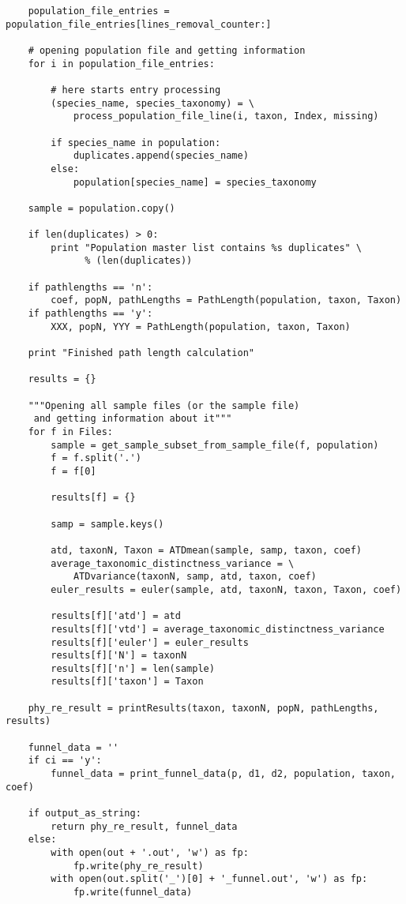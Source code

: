\documentclass[a4paper,11pt]{article}
\begin{document}
\begin{lstlisting}
    population_file_entries = population_file_entries[lines_removal_counter:]

    # opening population file and getting information
    for i in population_file_entries:

        # here starts entry processing
        (species_name, species_taxonomy) = \
            process_population_file_line(i, taxon, Index, missing)

        if species_name in population:
            duplicates.append(species_name)
        else:
            population[species_name] = species_taxonomy

    sample = population.copy()

    if len(duplicates) > 0:
        print "Population master list contains %s duplicates" \
              % (len(duplicates))

    if pathlengths == 'n':
        coef, popN, pathLengths = PathLength(population, taxon, Taxon)
    if pathlengths == 'y':
        XXX, popN, YYY = PathLength(population, taxon, Taxon)

    print "Finished path length calculation"

    results = {}

    """Opening all sample files (or the sample file)
     and getting information about it"""
    for f in Files:
        sample = get_sample_subset_from_sample_file(f, population)
        f = f.split('.')
        f = f[0]

        results[f] = {}

        samp = sample.keys()

        atd, taxonN, Taxon = ATDmean(sample, samp, taxon, coef)
        average_taxonomic_distinctness_variance = \
            ATDvariance(taxonN, samp, atd, taxon, coef)
        euler_results = euler(sample, atd, taxonN, taxon, Taxon, coef)

        results[f]['atd'] = atd
        results[f]['vtd'] = average_taxonomic_distinctness_variance
        results[f]['euler'] = euler_results
        results[f]['N'] = taxonN
        results[f]['n'] = len(sample)
        results[f]['taxon'] = Taxon

    phy_re_result = printResults(taxon, taxonN, popN, pathLengths, results)

    funnel_data = ''
    if ci == 'y':
        funnel_data = print_funnel_data(p, d1, d2, population, taxon, coef)

    if output_as_string:
        return phy_re_result, funnel_data
    else:
        with open(out + '.out', 'w') as fp:
            fp.write(phy_re_result)
        with open(out.split('_')[0] + '_funnel.out', 'w') as fp:
            fp.write(funnel_data)



\end{lstlisting}
\end{document}
